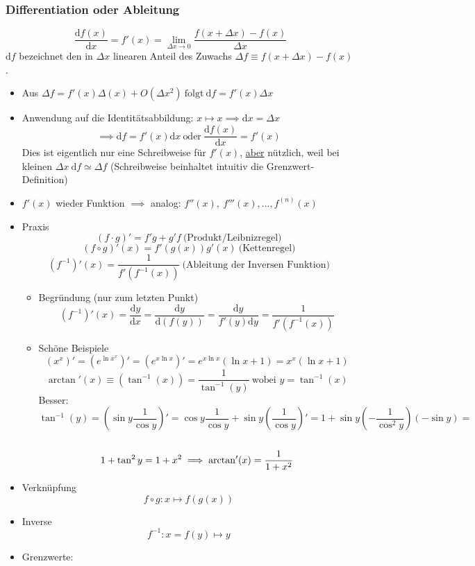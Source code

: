 \documentclass[a4paper]{scrartcl}
\theoremstyle{definition}
\theoremstyle{plain}
\theoremstyle{remark}
\theoremstyle{remark}
\begin{document}
\subsubsection{Differentiation oder Ableitung}
\label{sec-2-2-2}
\[\frac{\mathrm{d}f(x)}{\mathrm{d}x} = f'(x) = \lim_{\Delta x \to 0} \frac{f(x + \Delta x) - f(x)}{\Delta x}\]
$\mathrm{d}f$ bezeichnet den in $\Delta x$ linearen Anteil des Zuwachs $\Delta f\equiv f(x + \Delta x) - f(x)$.
\begin{itemize}
\item Aus $\Delta f = f'(x)\Delta(x) + O(\Delta x^2)~\text{folgt}~\mathrm{d}f = f'(x)\Delta x$
\item Anwendung auf die Identitätsabbildung: $x \mapsto x \implies \mathrm{d}x = \Delta x$
          \[\implies \mathrm{d}f = f'(x)\mathrm{d}x~\text{oder}~\frac{\mathrm{d}f(x)}{\mathrm{d}x} = f'(x)\]
          Dies ist eigentlich nur eine Schreibweise für $f'(x)$, \uline{aber} nützlich, weil bei kleinen $\Delta x~\mathrm{d}f \simeq \Delta f$ (Schreibweise beinhaltet intuitiv die Grenzwert-Definition)
\item $f'(x)$ wieder Funktion $\implies$ analog: $f''(x),~f'''(x),\ldots,f^{(n)}(x)$
\item Praxis
\[(f\cdot g)' = f' g + g' f~\text{(Produkt/Leibnizregel)}\]
\[(f \circ g)'(x) = f'(g(x))g'(x)~\text{(Kettenregel)}\]
\[(f^{-1})'(x) = \frac{1}{f'(f^{-1}(x))}~\text{(Ableitung der Inversen Funktion)}\]
\begin{itemize}
\item Begründung (nur zum letzten Punkt)
\[(f^{-1})'(x) = \frac{\mathrm{d}y}{\mathrm{d}x} = \frac{\mathrm{d}y}{\mathrm{d}(f(y))} = \frac{\mathrm{d}y}{f'(y)\mathrm{d}y} = \frac{1}{f'(f^{-1}(x))}\]
\item Schöne Beispiele
\[(x^x)' = (e^{\ln{x^x}})' = (e^{x\ln{x}})' = e^{x\ln{x}}(\ln{x} + 1) = x^x(\ln{x} + 1)\]
\[\arctan'(x) \equiv (\tan^{-1}(x)) = \frac{1}{\tan^{-1}(y)}~\text{wobei $y = \tan^{-1}(x)$}\]
Besser: \[\tan^{-1}(y) = (\sin{y} \frac{1}{\cos{y}})' = \cos{y} \frac{1}{\cos{y}} + \sin{y}(\frac{1}{\cos{y}})' = 1 + \sin{y}(-\frac{1}{\cos^2{y}})(-\sin{y}) = \] \\
                \[ 1 + \tan^2{y} = 1 + x^2 \\ \implies \arctan'(x) = \frac{1}{1 + x^2}\]
\end{itemize}
\item Verknüpfung \[f\circ g: x\mapsto f(g(x))\]
\item Inverse \[f^{-1} : x=f(y)\mapsto y\]
\item Grenzwerte:

\end{itemize}
\end{document}
